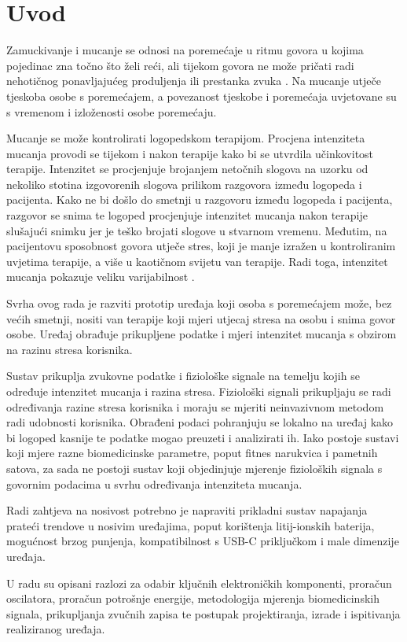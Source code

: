 \chapter{Uvod}
\label{pog:uvod}

Zamuckivanje i mucanje se odnosi na poremećaje u ritmu govora u kojima pojedinac zna točno što želi reći, ali tijekom govora ne može pričati radi nehotičnog ponavljajućeg produljenja ili prestanka zvuka \cite{who}. Na mucanje utječe tjeskoba osobe s poremećajem, a povezanost tjeskobe i poremećaja uvjetovane su s vremenom i izloženosti osobe poremećaju.

Mucanje se može kontrolirati logopedskom terapijom. Procjena intenziteta mucanja provodi se tijekom i nakon terapije kako bi se utvrdila učinkovitost terapije. Intenzitet se procjenjuje brojanjem netočnih slogova na uzorku od nekoliko stotina izgovorenih slogova prilikom razgovora između logopeda i pacijenta. Kako ne bi došlo do smetnji u razgovoru između logopeda i pacijenta, razgovor se snima te logoped procjenjuje intenzitet mucanja nakon terapije slušajući snimku jer je teško brojati slogove u stvarnom vremenu. Međutim, na pacijentovu sposobnost govora utječe stres, koji je manje izražen u kontroliranim uvjetima terapije, a više u kaotičnom svijetu van terapije. Radi toga, intenzitet mucanja pokazuje veliku varijabilnost \cite{TICHENOR2015}.

Svrha ovog rada je razviti prototip uređaja koji osoba s poremećajem može, bez većih smetnji, nositi van terapije koji mjeri utjecaj stresa na osobu i snima govor osobe. Uređaj obrađuje prikupljene podatke i mjeri intenzitet mucanja s obzirom na razinu stresa korisnika.

Sustav prikuplja zvukovne podatke i fiziološke signale na temelju kojih se određuje intenzitet mucanja i razina stresa. Fiziološki signali prikupljaju se radi određivanja razine stresa korisnika i moraju se mjeriti neinvazivnom metodom radi udobnosti korisnika. Obrađeni podaci pohranjuju se lokalno na uređaj kako bi logoped kasnije te podatke mogao preuzeti i analizirati ih. Iako postoje sustavi koji mjere razne biomedicinske parametre, poput fitnes narukvica i pametnih satova, za sada ne postoji sustav koji objedinjuje mjerenje fizioloških signala s govornim podacima u svrhu određivanja intenziteta mucanja.

Radi zahtjeva na nosivost potrebno je napraviti prikladni sustav napajanja prateći trendove u nosivim uređajima, poput korištenja litij-ionskih baterija, mogućnost brzog punjenja, kompatibilnost s USB-C priključkom i male dimenzije uređaja.

U radu su opisani razlozi za odabir ključnih elektroničkih komponenti, proračun oscilatora, proračun potrošnje energije, metodologija mjerenja biomedicinskih signala, prikupljanja zvučnih zapisa te postupak projektiranja, izrade i ispitivanja realiziranog uređaja.
